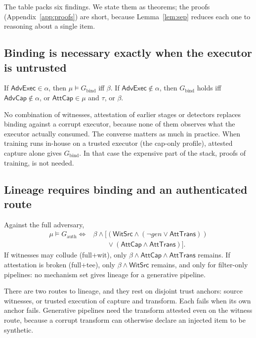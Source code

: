 The table packs six findings. We state them as theorems; the proofs (Appendix~\ref{app:proofs})
are short, because Lemma~\ref{lem:sep} reduces each one to reasoning about a single item.

\subsection{Binding is necessary exactly when the executor is untrusted}

\begin{theorem}[Binding]\label{thm:bind}
If $\textsf{AdvExec}\in\alpha$, then $\mu\models G_{\mathrm{bind}}$ iff
$\beta$. If $\textsf{AdvExec}\notin\alpha$, then $G_{\mathrm{bind}}$ holds iff
$\textsf{AdvCap}\notin\alpha$, or $\textsf{AttCap}\in\mu$ and $\tau$, or $\beta$.
\end{theorem}

No combination of witnesses, attestation of earlier stages or detectors replaces binding
against a corrupt executor, because none of them observes what the executor actually
consumed. The converse matters as much in practice. When training runs in-house on a
trusted executor (the cap-only profile), attested capture alone gives $G_{\mathrm{bind}}$.
In that case the expensive part of the stack, proofs of training, is not needed.

\subsection{Lineage requires binding and an authenticated route}

\begin{theorem}\label{thm:auth}
Against the full adversary,
\begin{align*}
\mu\models G_{\mathrm{auth}}\iff{}& \beta\wedge\big[(\textsf{WitSrc}\wedge(\neg\mathit{gen}\vee\textsf{AttTrans}))\\
&\qquad\vee(\textsf{AttCap}\wedge\textsf{AttTrans})\big].
\end{align*}
If witnesses may collude (full+wit), only $\beta\wedge\textsf{AttCap}\wedge\textsf{AttTrans}$
remains. If attestation is broken (full+tee), only $\beta\wedge\textsf{WitSrc}$ remains, and
only for filter-only pipelines: no mechanism set gives lineage for a generative pipeline.
\end{theorem}

There are two routes to lineage, and they rest on disjoint trust anchors: source
witnesses, or trusted execution of capture and transform. Each fails when its own anchor
fails. Generative pipelines need the transform attested even on the witness route, because
a corrupt transform can otherwise declare an injected item to be synthetic.

